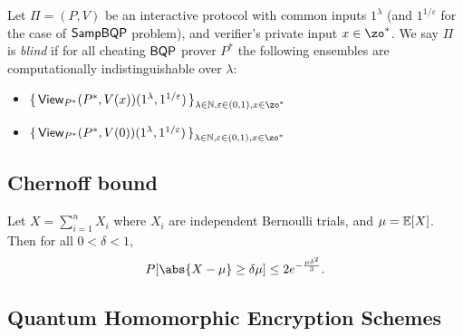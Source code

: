 \begin{definition}
	Let $\Pi=(P, V)$ be an interactive protocol with common inputs $1^\lambda$ (and $1^{1/\varepsilon}$ for the case of $\operatorname{\mathsf{SampBQP}}$ problem), and verifier's private input $x\in\zo^*$.
	We say $\Pi$ is \emph{blind} if for all cheating $\operatorname{\mathsf{BQP}}$ prover $P^*$ the following ensembles are computationally indistinguishable over $\lambda$:
	\begin{itemize}
		\item $\set{\View_{P^*}(P^*, V(x))(1^\lambda, 1^{1/\varepsilon})}_{\lambda\in\bbN, \varepsilon\in(0,1), x\in\zo^*}$
		\item $\set{\View_{P^*}(P^*, V(0))(1^\lambda, 1^{1/\varepsilon})}_{\lambda\in\bbN, \varepsilon\in(0,1), x\in\zo^*}$
	\end{itemize}
\end{definition}

\subsection{Chernoff bound}

\begin{thm}
\label{thm:Chernoff}
Let $X=\sum_{i=1}^n X_i$ where $X_i$ are independent Bernoulli trials, and $\mu=\operatorname*{\mathbb{E}}[X]$.
Then for all $0<\delta<1$,
$$P[\abs{X-\mu}\geq\delta\mu]\leq2e^{-\frac{\mu\delta^2}{3}}.$$
\end{thm}

\subsection{Quantum Homomorphic Encryption Schemes}

\def\QHE{\mathsf{QHE}}
\def\QGen{\mathsf{QHE.Keygen}}
\def\QEnc{\mathsf{QHE.Enc}}
\def\QEval{\mathsf{QHE.Eval}}
\def\QDec{\mathsf{QHE.Dec}}

